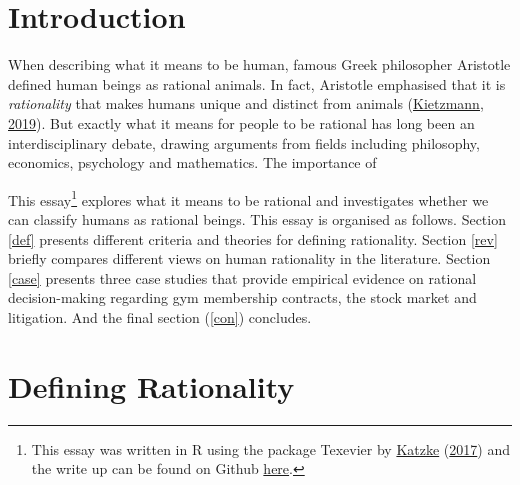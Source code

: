 \documentclass[11pt,preprint, authoryear]{elsarticle}
\numberwithin{equation}{section}
\numberwithin{figure}{section}
\numberwithin{table}{section}
\let\rmarkdownfootnote\footnote%
\def\footnote{\protect\rmarkdownfootnote}
\begin{document}
\renewcommand{\contentsname}{Table of Contents}
{\tableofcontents}

\pagestyle{fancy}
\chead{}
\rhead{}
\lfoot{}
\lhead{}
\cfoot{}


\headsep 35pt %




\newpage

\hypertarget{introduction}{%
\section{\texorpdfstring{Introduction
\label{Introduction}}{Introduction }}\label{introduction}}

When describing what it means to be human, famous Greek philosopher
Aristotle defined human beings as rational animals. In fact, Aristotle
emphasised that it is \emph{rationality} that makes humans unique and
distinct from animals (\protect\hyperlink{ref-aristotle}{Kietzmann,
2019}). But exactly what it means for people to be rational has long
been an interdisciplinary debate, drawing arguments from fields
including philosophy, economics, psychology and mathematics. The
importance of

This essay\footnote{This essay was written in R using the package
  Texevier by \protect\hyperlink{ref-Texevier}{Katzke}
  (\protect\hyperlink{ref-Texevier}{2017}) and the write up can be found
  on Github \href{https://github.com/cass-code/Phil_essay}{here}.}
explores what it means to be rational and investigates whether we can
classify humans as rational beings. This essay is organised as follows.
Section \ref{def} presents different criteria and theories for defining
rationality. Section \ref{rev} briefly compares different views on human
rationality in the literature. Section \ref{case} presents three case
studies that provide empirical evidence on rational decision-making
regarding gym membership contracts, the stock market and litigation. And
the final section (\ref{con}) concludes.

\hypertarget{defining-rationality}{%
\section{\texorpdfstring{Defining Rationality
\label{def}}{Defining Rationality }}\label{defining-rationality}}
\end{document}
